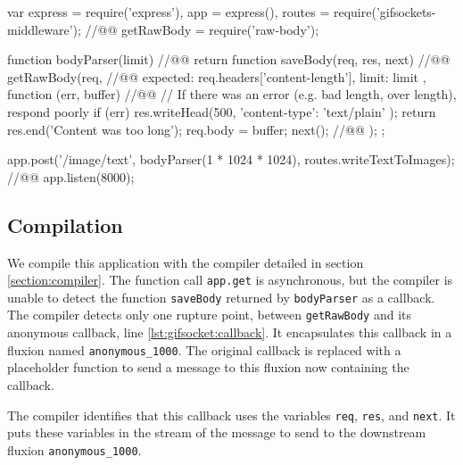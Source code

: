 \begin{code}[js, caption={Simplified version of gifsockets-server},label={lst:gifsocket}]
var express = require('express'),
    app = express(),
    routes = require('gifsockets-middleware'); //@\label{lst:gifsocket:gif-mw}@
    getRawBody = require('raw-body');

function bodyParser(limit) { //@\label{lst:gifsocket:bodyParser}@
  return function saveBody(req, res, next) { //@\label{lst:gifsocket:saveBody}@
    getRawBody(req, { //@\label{lst:gifsocket:getRawBody}@
      expected: req.headers['content-length'],
      limit: limit
    }, function (err, buffer) { //@\label{lst:gifsocket:callback}@
      // If there was an error (e.g. bad length, over length), respond poorly
      if (err) {
        res.writeHead(500, {
          'content-type': 'text/plain'
        });
        return res.end('Content was too long');
      }
      req.body = buffer;
      next(); //@\label{lst:gifsocket:next}@
    });
  };
}

app.post('/image/text', bodyParser(1 * 1024 * 1024), routes.writeTextToImages); //@\label{lst:gifsocket:app.post}@
app.listen(8000);
\end{code}


\subsection{Compilation}

We compile this application with the compiler detailed in section \ref{section:compiler}.
The function call \texttt{app.get} is asynchronous, but the compiler is unable to detect the function \texttt{saveBody} returned by \texttt{bodyParser} as a callback.
The compiler detects only one rupture point, between \texttt{getRawBody} and its anonymous callback, line \ref{lst:gifsocket:callback}.
It encapsulates this callback in a fluxion named \texttt{anonymous\-\_1000}.
The original callback is replaced with a placeholder function to send a message to this fluxion now containing the callback.

The compiler identifies that this callback uses the variables \texttt{req}, \texttt{res}, and \texttt{next}.
It puts these variables in the stream of the message to send to the downstream fluxion \texttt{anonymous\-\_1000}.


